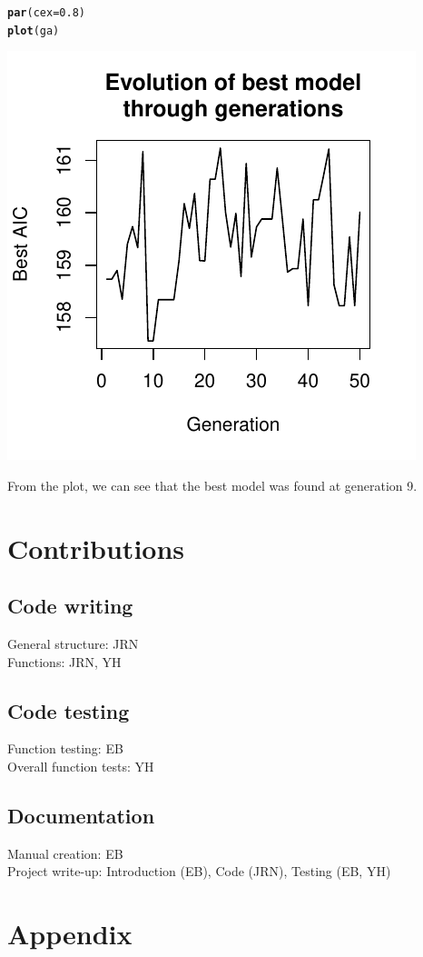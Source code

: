 \documentclass[11pt]{article}
\makeatletter
\def\maxwidth{ %
  \ifdim\Gin@nat@width>\linewidth
    \linewidth
  \else
    \Gin@nat@width
  \fi
}
\newcommand{\hlnum}[1]{\textcolor[rgb]{0.686,0.059,0.569}{#1}}%
\newcommand{\hlstd}[1]{\textcolor[rgb]{0.345,0.345,0.345}{#1}}%
\newcommand{\hlkwc}[1]{\textcolor[rgb]{0.333,0.667,0.333}{#1}}%
\newcommand{\hlkwd}[1]{\textcolor[rgb]{0.737,0.353,0.396}{\textbf{#1}}}%
\newenvironment{kframe}{%
 \def\at@end@of@kframe{}%
 \ifinner\ifhmode%
  \def\at@end@of@kframe{\end{minipage}}%
  \begin{minipage}{\columnwidth}%
 \fi\fi%
 \def\FrameCommand##1{\hskip\@totalleftmargin \hskip-\fboxsep
 \colorbox{shadecolor}{##1}\hskip-\fboxsep
     \hskip-\linewidth \hskip-\@totalleftmargin \hskip\columnwidth}%
 \MakeFramed {\advance\hsize-\width
   \@totalleftmargin\z@ \linewidth\hsize
   \@setminipage}}%
 {\par\unskip\endMakeFramed%
 \at@end@of@kframe}
\newenvironment{knitrout}{}{} %
\makeatother
\begin{document}
\begin{knitrout}
\color{fgcolor}\begin{kframe}
\begin{alltt}
\hlkwd{par}\hlstd{(}\hlkwc{cex} \hlstd{=} \hlnum{0.8}\hlstd{)}
\hlkwd{plot}\hlstd{(ga)}
\end{alltt}
\end{kframe}
\includegraphics[width=\maxwidth]{figure/latex-unnamed-chunk-4} 


\end{knitrout}

From the plot, we can see that the best model was found at generation 9. 
\section{Contributions} 
\label{sec:contributions}
\subsection{Code writing}
General structure: JRN\\
Functions: JRN, YH

\subsection{Code testing}
Function testing: EB\\
Overall function tests: YH

\subsection{Documentation}
Manual creation: EB\\
Project write-up: Introduction (EB), Code (JRN), Testing (EB, YH)

\section{Appendix}
\label{sec:appendix}

\end{document}

